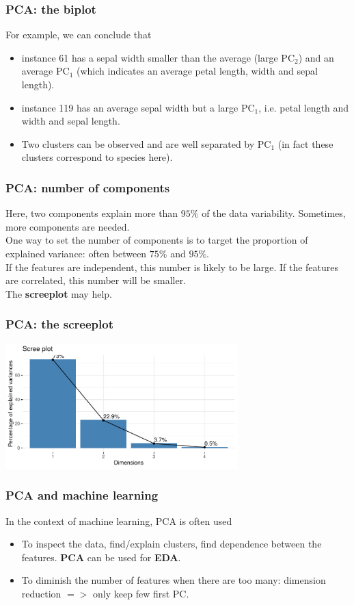 \begin{frame}
\frametitle{PCA: the biplot}
For example, we can conclude that
\begin{itemize}
\item instance 61 has a sepal width smaller than the average (large PC$_2$) and an average PC$_1$ (which indicates an average petal length, width and sepal length).
\item instance 119 has an average sepal width but a large PC$_1$, i.e. petal length and width and sepal length.
\item Two clusters can be observed and are well separated by PC$_1$ (in fact these clusters correspond to species here).
\end{itemize}
\end{frame}
\begin{frame}
\frametitle{PCA: number of components}
Here, two components explain more than $95\%$ of the data variability. Sometimes, more components are needed.\\ 
\vspace{0.2cm}
One way to set the number of components is to target the proportion of explained variance: often between $75\%$ and $95\%$. \\
\vspace{0.2cm}
If the features are independent, this number is likely to be large. If the features are correlated, this number will be smaller.\\
\vspace{0.2cm}
The {\bf screeplot} may help.
\end{frame}
\begin{frame}
\frametitle{PCA: the screeplot}
\begin{center}
\includegraphics[width=9cm]{../../Graphs/Iris_scree.pdf}
\end{center}
\end{frame}
\begin{frame}
\frametitle{PCA and machine learning}
In the context of machine learning, PCA is often used 
\begin{itemize}
\item To inspect the data, find/explain clusters, find dependence between the features. {\bf PCA} can be used for {\bf EDA}.
\item To diminish the number of features when there are too many: dimension reduction $=>$ only keep few first PC.
\end{itemize}
\end{frame}
